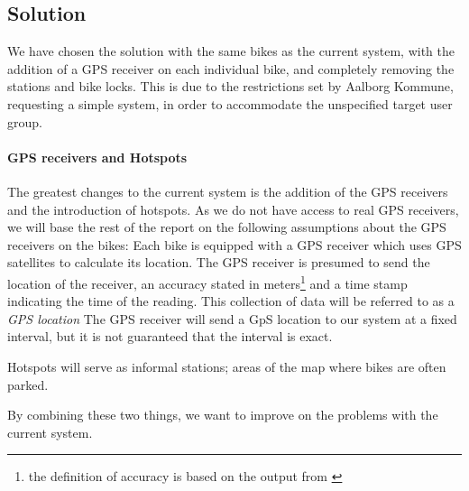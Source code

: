 \subsection{Solution} \label{prob_statement:solution}
We have chosen the solution with the same bikes as the current system, with the addition of a GPS receiver on each individual bike, and completely removing the stations and bike locks.
This is due to the restrictions set by Aalborg Kommune, requesting a simple system, in order to accommodate the unspecified target user group.


\paragraph{GPS receivers and Hotspots}\label{gpsreceiver}
The greatest changes to the current system is the addition of the GPS receivers and the introduction of hotspots.
As we do not have access to real GPS receivers, we will base the rest of the report on the following assumptions about the GPS receivers on the bikes:
Each bike is equipped with a GPS receiver which uses GPS satellites to calculate its location. The GPS receiver is presumed to send the location of the receiver, an accuracy stated in meters\footnote{the definition of accuracy is based on the output from \citet{followmee}} and a time stamp indicating the time of the reading.
This collection of data will be referred to as a \emph{GPS location}	
The GPS receiver will send a GpS location to our system at a fixed interval, but it is not guaranteed that the interval is exact.

Hotspots will serve as informal stations; areas of the map where bikes are often parked.

By combining these two things, we want to improve on the problems with the current system.

